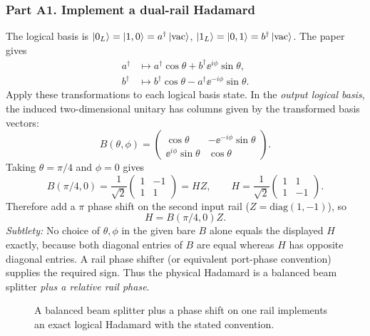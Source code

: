 \subsubsection*{Part A1. Implement a dual-rail Hadamard}
The logical basis is $\left\lvert 0_L\right\rangle=\left\lvert 1,0\right\rangle=a^\dagger\left\lvert \mathrm{vac}\right\rangle$, $\left\lvert 1_L\right\rangle=\left\lvert 0,1\right\rangle=b^\dagger\left\lvert \mathrm{vac}\right\rangle$. The paper gives
\begin{equation}
\begin{split}
a^\dagger&\mapsto a^\dagger\cos\theta+b^\dagger\ee^{i\phi}\sin\theta,\\
b^\dagger&\mapsto b^\dagger\cos\theta-a^\dagger\ee^{-i\phi}\sin\theta.
\end{split}
\end{equation}
Apply these transformations to each logical basis state. In the \emph{output logical basis}, the induced two-dimensional unitary has columns given by the transformed basis vectors:
\begin{equation}\label{eq:24bs}
B(\theta,\phi)=\begin{pmatrix}
\cos\theta&-\ee^{-i\phi}\sin\theta\\
\ee^{i\phi}\sin\theta&\cos\theta
\end{pmatrix}.
\end{equation}
Taking $\theta=\pi/4$ and $\phi=0$ gives
\begin{equation}B(\pi/4,0)=\frac1{\sqrt2}\begin{pmatrix}1&-1\\1&1\end{pmatrix}=HZ,\qquad H=\frac1{\sqrt2}\begin{pmatrix}1&1\\1&-1\end{pmatrix}.\end{equation}
Therefore add a $\pi$ phase shift on the second input rail ($Z=\mathrm{diag}(1,-1)$), so
\begin{equation}\boxed{H=B(\pi/4,0)Z.}\end{equation}
\emph{Subtlety:} No choice of $\theta,\phi$ in the given bare $B$ alone equals the displayed $H$ exactly, because both diagonal entries of $B$ are equal whereas $H$ has opposite diagonal entries. A rail phase shifter (or equivalent port-phase convention) supplies the required sign. Thus the physical Hadamard is a balanced beam splitter \emph{plus a relative rail phase}.
\begin{figure}[htbp]\centering
{}
\caption{A balanced beam splitter plus a phase shift on one rail implements an exact logical Hadamard with the stated convention.}
\end{figure}

